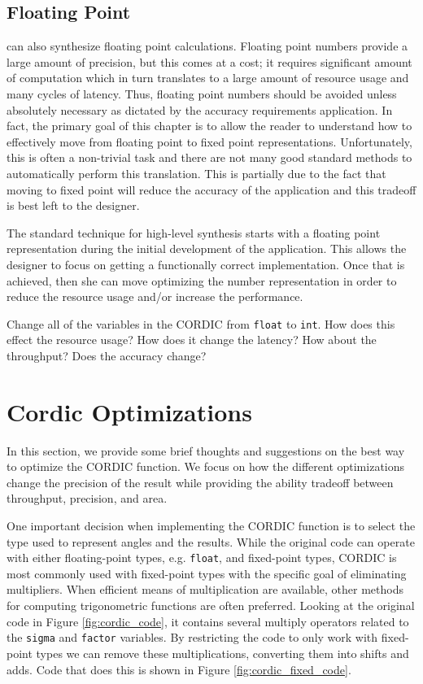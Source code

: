 \subsection{Floating Point}
\label{sec:floating_point}

\VHLS can also synthesize floating point calculations. Floating point numbers provide a large amount of precision, but this comes at a cost; it requires significant amount of computation which in turn translates to a large amount of resource usage and many cycles of latency. Thus, floating point numbers should be avoided unless absolutely necessary as dictated by the accuracy requirements application. In fact, the primary goal of this chapter is to allow the reader to understand how to effectively move from floating point to fixed point representations. Unfortunately, this is often a non-trivial task and there  are not many good standard methods to automatically perform this translation. This is partially due to the fact that moving to fixed point will reduce the accuracy of the application and this tradeoff is best left to the designer. 

The standard technique for high-level synthesis starts with a floating point representation during the initial development of the application. This allows the designer to focus on getting a functionally correct implementation. Once that is achieved, then she can move optimizing the number representation in order to reduce the resource usage and/or increase the performance. 

\begin{exercise}
Change all of the variables in the CORDIC from \lstinline{float} to \lstinline{int}. How does this effect the resource usage? How does it change the latency? How about the throughput? Does the accuracy change?
\end{exercise} 

\section{Cordic Optimizations}

In this section, we provide some brief thoughts and suggestions on the best way to optimize the CORDIC function. We focus on how the different optimizations change the precision of the result while providing the ability tradeoff between throughput, precision, and area. 

One important decision when implementing the CORDIC function is to select the type used to represent angles and the results.  While the original code can operate with either floating-point types, e.g. \lstinline{float}, and fixed-point types, CORDIC is most commonly used with fixed-point types with the specific goal of eliminating multipliers.  When efficient means of multiplication are available, other methods for computing trigonometric functions are often preferred.   Looking at the original code in Figure \ref{fig:cordic_code}, it contains several multiply operators  related to the \lstinline{sigma} and \lstinline{factor} variables.  By restricting the code to only work with fixed-point types we can remove these multiplications, converting them into shifts and adds.  Code that does this is shown in Figure \ref{fig:cordic_fixed_code}.


